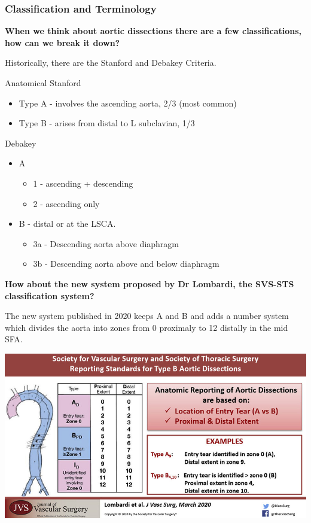 \documentclass[
]{book}
\begin{document}
\hypertarget{classification-and-terminology}{%
\subsubsection{Classification and Terminology}\label{classification-and-terminology}}

\textbf{When we think about aortic dissections there are a few
classifications, how can we break it down?}

Historically, there are the Stanford and Debakey Criteria.

Anatomical Stanford

\begin{itemize}
\item
  Type A - involves the ascending aorta, 2/3 (most common)
\item
  Type B - arises from distal to L subclavian, 1/3
\end{itemize}

Debakey

\begin{itemize}
\item
  A

  \begin{itemize}
  \item
    1 - ascending + descending
  \item
    2 - ascending only
  \end{itemize}
\item
  B - distal or at the LSCA.

  \begin{itemize}
  \item
    3a - Descending aorta above diaphragm
  \item
    3b - Descending aorta above and below diaphragm
  \end{itemize}
\end{itemize}

\textbf{How about the new system proposed by Dr Lombardi, the SVS-STS
classification system?}

The new system published in 2020 keeps A and B and adds a number system
which divides the aorta into zones from 0 proximaly to 12 distally in
the mid SFA. \citep{lombardiSocietyVascularSurgery2020}

\includegraphics[width=13.06in]{images/thoracic_dissection1}
\end{document}
